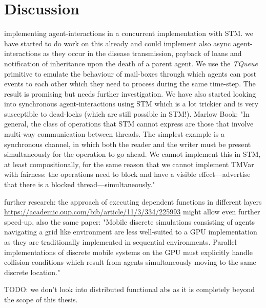 \section{Discussion}
implementing agent-interactions in a concurrent implementation with STM. we have started to do work on this already and could implement also async agent-interactions as they occur in the disease transmission, payback of loans and notification of inheritance upon the death of a parent agent. We use the \textit{TQueue} primitive to emulate the behaviour of mail-boxes through which agents can post events to each other which they need to process during the same time-step. The result is promising but needs further investigation. We have also started looking into synchronous agent-interactions using STM which is a lot trickier and is very susceptible to dead-locks (which are still possible in STM!).
Marlow Book: "In general, the class of operations that STM cannot express are those that involve multi-way communication between threads. The simplest example is a synchronous channel, in which both the reader and the writer must be present simultaneously for the operation to go ahead. We cannot implement this in STM, at least compositionally, for the same reason that we cannot implement TMVar with fairness: the operations need to block and have a visible effect—advertise that there is a blocked thread—simultaneously."


further research: the approach of executing dependent functions in different layers \url{https://academic.oup.com/bib/article/11/3/334/225993} might allow even further speed-up, also the same paper: "Mobile discrete simulations consisting of agents navigating a grid like environment are less well-suited to a GPU implementation as they are traditionally implemented in sequential environments. Parallel implementations of discrete mobile systems on the GPU must explicitly handle collision conditions which result from agents simultaneously moving to the same discrete location."

TODO: we don't look into distributed functional abs as it is completely beyond the scope of this thesis.
